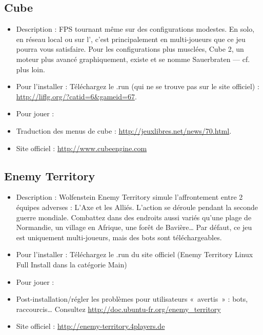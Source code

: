 \subsection{Cube}
\begin{itemize}
\begingroup
{}
\item Description : FPS tournant même sur des configurations modestes. En solo, en réseau local ou sur l', c'est principalement en multi-joueurs que ce jeu pourra vous satisfaire. Pour les configurations plus musclées, Cube 2, un moteur plus avancé graphiquement, existe et se nomme Sauerbraten --- cf. plus loin.{\par}
\endgroup
\item Pour l'installer : Téléchargez le .run (qui ne se trouve pas sur le site officiel) : \url{http://liflg.org/?catid=6&gameid=67}.{\par}
\item Pour jouer : 
\item Traduction des menus de cube : \url{http://jeuxlibres.net/news/70.html}.{\par}
\item Site officiel : \url{http://www.cubeengine.com}{\par}
\end{itemize}
\subsection{Enemy Territory}
\begin{itemize}
\begingroup
{}
\item Description : Wolfenstein Enemy Territory simule l'affrontement entre 2 équipes adverses : L'Axe et les Alliés. L'action se déroule pendant la seconde guerre mondiale. Combattez dans des endroits aussi variés qu'une plage de Normandie, un village en Afrique, une forêt de Bavière\ldots{} Par défaut, ce jeu est uniquement multi-joueurs, mais des bots sont téléchargeables.{\par}
\endgroup
\item Pour l'installer : Téléchargez le .run du site officiel (Enemy Territory Linux  Full Install dans la catégorie Main){\par}
\item Pour jouer : 
\item Post-installation/régler les problèmes pour utilisateurs «~avertis~» : bots, raccourcis\ldots{} Consultez \url{http://doc.ubuntu-fr.org/enemy_territory}{\par}
\item Site officiel : \url{http://enemy-territory.4players.de}{\par}
\end{itemize}
